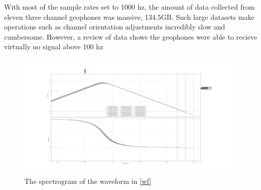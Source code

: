 With most of the sample rates set to 1000 hz, the amount of data collected from  eleven three channel geophones  was massive, 134.5GB. Such large datasets make operations such as channel orientation adjustments incredibly slow and cumbersome. 
However, a review of data  shows the geophones were able to recieve virtually no signal above 100 hz

\begin{figure}[h]
    \centering
    \includegraphics[width = \textwidth]{reportImgs/frResponse.png}
    \caption{The spectrogram of the waveform in \ref{wf}}    
    \label{fr}
\end{figure}
